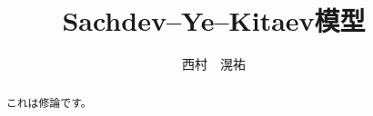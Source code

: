 \title{Sachdev--Ye--Kitaev模型}
\author{西村　滉祐}
\date{}
\maketitle

\begin{abstract}
	これは修論です。
\end{abstract}

\thispagestyle{empty}
\pagebreak
